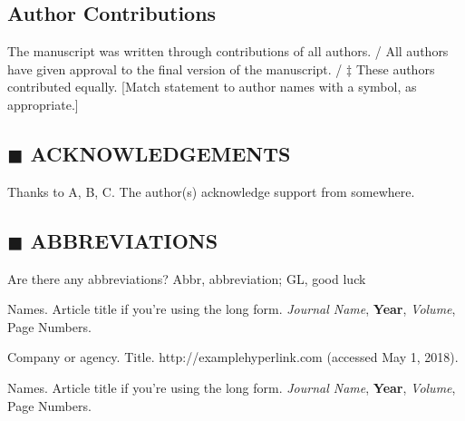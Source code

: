 \documentclass[9.5pt,twocolumn]{article}
\begin{document}
\subsection*{Author Contributions} \noindent
The manuscript was written through contributions of all authors. / All authors have given approval to the final version of the manuscript. / $\ddagger$ These authors contributed equally.  [Match statement to author names with a symbol, as appropriate.]

\textcolor{jblue}{\vspace{-0.5cm}\subsection*{$\blacksquare$ ACKNOWLEDGEMENTS}} \noindent
Thanks to A, B, C. The author(s) acknowledge support from somewhere.

\textcolor{jblue}{\subsection*{$\blacksquare$ ABBREVIATIONS}} \noindent
Are there any abbreviations? Abbr, abbreviation; GL, good luck \\



\begin{thebibliography}{99}
Names.
Article title if you're using the long form.
\textit{Journal Name},
\textbf{Year},
\textit{Volume},
Page Numbers.

Company or agency. Title. http://examplehyperlink.com (accessed May 1, 2018).

Names.
Article title if you're using the long form.
\textit{Journal Name},
\textbf{Year},
\textit{Volume},
Page Numbers.


\end{thebibliography}
\end{document}
